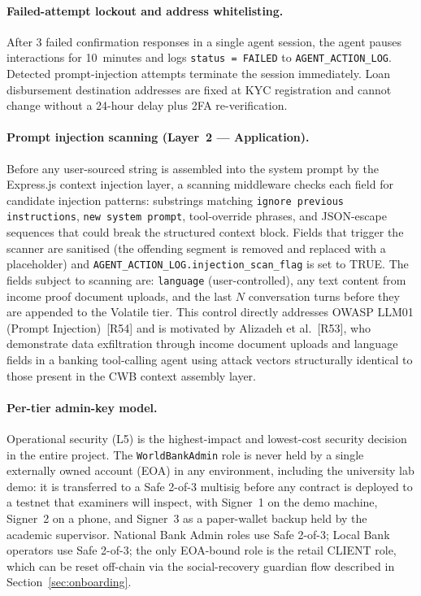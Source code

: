 \documentclass[12pt,a4paper]{report}
\begin{document}
\paragraph{Failed-attempt lockout and address whitelisting.}
After 3 failed confirmation responses in a single agent session, the agent pauses interactions for 10~minutes and logs \texttt{status = FAILED} to \texttt{AGENT\_ACTION\_LOG}. Detected prompt-injection attempts terminate the session immediately. Loan disbursement destination addresses are fixed at KYC registration and cannot change without a 24-hour delay plus 2FA re-verification.

\paragraph{Prompt injection scanning (Layer~2 --- Application).} Before any
user-sourced string is assembled into the system prompt by the Express.js context
injection layer, a scanning middleware checks each field for candidate injection
patterns: substrings matching \texttt{ignore previous instructions},
\texttt{new system prompt}, tool-override phrases, and JSON-escape sequences that
could break the structured context block. Fields that trigger the scanner are
sanitised (the offending segment is removed and replaced with a placeholder) and
\texttt{AGENT\_ACTION\_LOG.injection\_scan\_flag} is set to TRUE. The fields
subject to scanning are: \texttt{language} (user-controlled), any text content
from income proof document uploads, and the last $N$ conversation turns before
they are appended to the Volatile tier. This control directly addresses OWASP
LLM01 (Prompt Injection)~[R54] and is motivated by Alizadeh et
al.~[R53], who demonstrate data exfiltration through
income document uploads and language fields in a banking tool-calling agent using
attack vectors structurally identical to those present in the CWB context assembly
layer.

\paragraph{Per-tier admin-key model.}
Operational security (L5) is the highest-impact and lowest-cost security decision in the entire project. The \texttt{WorldBankAdmin} role is never held by a single externally owned account (EOA) in any environment, including the university lab demo: it is transferred to a Safe 2-of-3 multisig before any contract is deployed to a testnet that examiners will inspect, with Signer~1 on the demo machine, Signer~2 on a phone, and Signer~3 as a paper-wallet backup held by the academic supervisor. National Bank Admin roles use Safe 2-of-3; Local Bank operators use Safe 2-of-3; the only EOA-bound role is the retail CLIENT role, which can be reset off-chain via the social-recovery guardian flow described in Section~\ref{sec:onboarding}.
\end{document}
